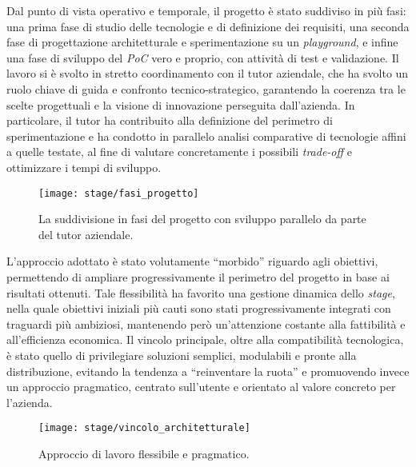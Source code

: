 Dal punto di vista operativo e temporale, il progetto è stato suddiviso in più fasi: una prima fase di studio delle tecnologie e di definizione dei requisiti, 
una seconda fase di progettazione architetturale e sperimentazione su un \emph{playground}, e infine una fase di sviluppo del \emph{PoC} vero e proprio, con attività di test e validazione. 
Il lavoro si è svolto in stretto coordinamento con il tutor aziendale, che ha svolto un ruolo chiave di guida e confronto tecnico-strategico, garantendo la coerenza tra 
le scelte progettuali e la visione di innovazione perseguita dall’azienda. 
In particolare, il tutor ha contribuito alla definizione del perimetro di sperimentazione e 
ha condotto in parallelo analisi comparative di tecnologie affini a quelle testate, al fine di valutare concretamente i possibili \emph{trade-off} e ottimizzare i tempi di sviluppo.
\begin{figure}[H]
    \centering
    \texttt{[image: stage/fasi\_progetto]}
    \caption{La suddivisione in fasi del progetto con sviluppo parallelo da parte del tutor aziendale.}
    \label{fig:fasi_progetto}
  \end{figure}
L’approccio adottato è stato volutamente “morbido” riguardo agli obiettivi, permettendo di ampliare progressivamente il perimetro del progetto in base ai risultati ottenuti. 
Tale flessibilità ha favorito una gestione dinamica dello \emph{stage}, nella quale obiettivi iniziali più cauti sono stati progressivamente integrati con traguardi più ambiziosi, 
mantenendo però un’attenzione costante alla fattibilità e all’efficienza economica. 
Il vincolo principale, oltre alla compatibilità tecnologica, è stato quello di privilegiare soluzioni semplici, modulabili e pronte alla distribuzione, evitando la tendenza a “reinventare la ruota” 
e promuovendo invece un approccio pragmatico, centrato sull’utente e orientato al valore concreto per l’azienda.
\begin{figure}[H]
    \centering
    \texttt{[image: stage/vincolo\_architetturale]}
    \caption{Approccio di lavoro flessibile e pragmatico.}
    \label{fig:vincolo_architetturale}
\end{figure}

